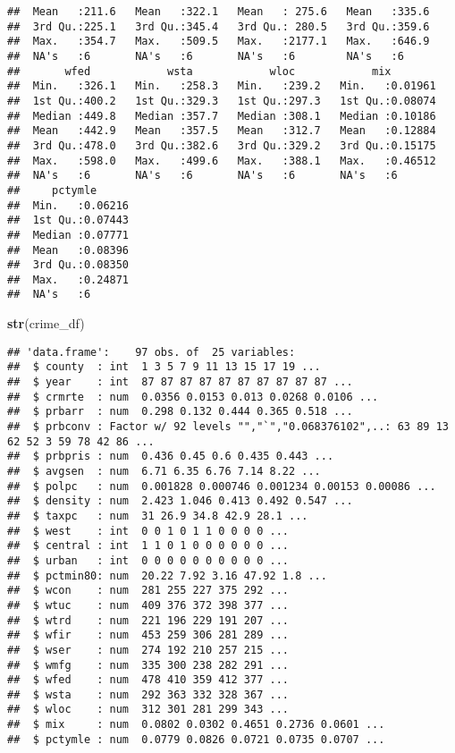 \documentclass[]{article}
\newenvironment{Shaded}{\begin{snugshade}}{\end{snugshade}}
\newcommand{\KeywordTok}[1]{\textcolor[rgb]{0.13,0.29,0.53}{\textbf{#1}}}
\newcommand{\NormalTok}[1]{#1}
\begin{document}
\begin{verbatim}
##  Mean   :211.6   Mean   :322.1   Mean   : 275.6   Mean   :335.6  
##  3rd Qu.:225.1   3rd Qu.:345.4   3rd Qu.: 280.5   3rd Qu.:359.6  
##  Max.   :354.7   Max.   :509.5   Max.   :2177.1   Max.   :646.9  
##  NA's   :6       NA's   :6       NA's   :6        NA's   :6      
##       wfed            wsta            wloc            mix         
##  Min.   :326.1   Min.   :258.3   Min.   :239.2   Min.   :0.01961  
##  1st Qu.:400.2   1st Qu.:329.3   1st Qu.:297.3   1st Qu.:0.08074  
##  Median :449.8   Median :357.7   Median :308.1   Median :0.10186  
##  Mean   :442.9   Mean   :357.5   Mean   :312.7   Mean   :0.12884  
##  3rd Qu.:478.0   3rd Qu.:382.6   3rd Qu.:329.2   3rd Qu.:0.15175  
##  Max.   :598.0   Max.   :499.6   Max.   :388.1   Max.   :0.46512  
##  NA's   :6       NA's   :6       NA's   :6       NA's   :6        
##     pctymle       
##  Min.   :0.06216  
##  1st Qu.:0.07443  
##  Median :0.07771  
##  Mean   :0.08396  
##  3rd Qu.:0.08350  
##  Max.   :0.24871  
##  NA's   :6
\end{verbatim}

\begin{Shaded}
\begin{Highlighting}[]
\KeywordTok{str}\NormalTok{(crime_df)}
\end{Highlighting}
\end{Shaded}

\begin{verbatim}
## 'data.frame':    97 obs. of  25 variables:
##  $ county  : int  1 3 5 7 9 11 13 15 17 19 ...
##  $ year    : int  87 87 87 87 87 87 87 87 87 87 ...
##  $ crmrte  : num  0.0356 0.0153 0.013 0.0268 0.0106 ...
##  $ prbarr  : num  0.298 0.132 0.444 0.365 0.518 ...
##  $ prbconv : Factor w/ 92 levels "","`","0.068376102",..: 63 89 13 62 52 3 59 78 42 86 ...
##  $ prbpris : num  0.436 0.45 0.6 0.435 0.443 ...
##  $ avgsen  : num  6.71 6.35 6.76 7.14 8.22 ...
##  $ polpc   : num  0.001828 0.000746 0.001234 0.00153 0.00086 ...
##  $ density : num  2.423 1.046 0.413 0.492 0.547 ...
##  $ taxpc   : num  31 26.9 34.8 42.9 28.1 ...
##  $ west    : int  0 0 1 0 1 1 0 0 0 0 ...
##  $ central : int  1 1 0 1 0 0 0 0 0 0 ...
##  $ urban   : int  0 0 0 0 0 0 0 0 0 0 ...
##  $ pctmin80: num  20.22 7.92 3.16 47.92 1.8 ...
##  $ wcon    : num  281 255 227 375 292 ...
##  $ wtuc    : num  409 376 372 398 377 ...
##  $ wtrd    : num  221 196 229 191 207 ...
##  $ wfir    : num  453 259 306 281 289 ...
##  $ wser    : num  274 192 210 257 215 ...
##  $ wmfg    : num  335 300 238 282 291 ...
##  $ wfed    : num  478 410 359 412 377 ...
##  $ wsta    : num  292 363 332 328 367 ...
##  $ wloc    : num  312 301 281 299 343 ...
##  $ mix     : num  0.0802 0.0302 0.4651 0.2736 0.0601 ...
##  $ pctymle : num  0.0779 0.0826 0.0721 0.0735 0.0707 ...
\end{verbatim}
\end{document}

